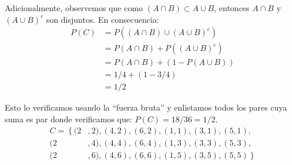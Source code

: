 \documentclass[14pt]{extreport}
\theoremstyle{definicion}
\theoremstyle{propiedad}
\begin{document}
Adicionalmente, observemos que como $(A \cap B) \subset A \cup B$, entonces $A \cap B$ y $(A
  \cup B)^c$ son disjuntos. En consecuencia:
\begin{equation*}
  \begin{split}
    P(C ) & = P((A \cap B) \cup (A \cup B)^c ) \\
    & = P(A \cap B) + P((A \cup B)^c )    \\
    & = P(A \cap B) + (1 - P(A \cup B)) \\
    & = 1/4 + (1-3/4)\\
    & = 1/2
  \end{split}
\end{equation*}

Esto lo verificamos usando la ``fuerza bruta'' y enlistamos todos los pares cuya suma es par donde verificamos que: $P(C ) = 18/36 = 1/2$.
\begin{equation*}
  \begin{split}
    C = \left\{\right. (2&, 2), (4, 2), (6, 2),(1, 1), (3, 1), (5, 1),\\
    (2&, 4), (4, 4), (6, 4),(1, 3), (3, 3), (5, 3),\\
    (2&, 6), (4, 6), (6, 6),(1, 5), (3, 5), (5, 5)\left.\right\}
  \end{split}
\end{equation*}
\end{document}

